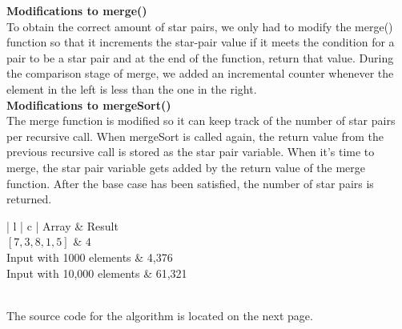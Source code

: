 \documentclass[11pt]{article}
\begin{document}
\textbf{\large{Modifications to merge()}} \\
To obtain the correct amount of star pairs, we only had to modify the merge() function so that it increments the star-pair value if it meets the condition for a pair to be a star pair and at the end of the function, return that value. During the comparison stage of merge, we added an incremental counter whenever the element in the left is less than the one in the right.
\vspace{5mm}\\
\textbf{\large{Modifications to mergeSort()}} \\
The merge function is modified so it can keep track of the number of star pairs per recursive call. When mergeSort is called again, the return value from the previous recursive call is stored as the star pair variable. When it's time to merge, the star pair variable gets added by the return value of the merge function. After the base case has been satisfied, the number of star pairs is returned.
\vspace{3mm} \\
\begin{center}
	\begin{tblr}{| l | c |}
		\hline
		Array                      & Result \\
		\toprule
		\([7, 3, 8, 1, 5]\)        & \(4\)  \\
		\hline
		Input with 1000 elements   & 4,376  \\
		\hline
		Input with 10,000 elements & 61,321 \\
		\hline
	\end{tblr} \vspace{5mm} \\
	The source code for the algorithm is located on the next page.
\end{center}
\end{document}
